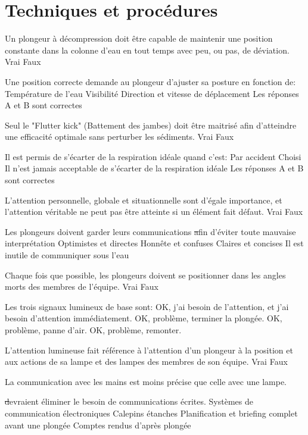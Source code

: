 \documentclass[english,10pt,a4paper,twoside]{article}
\begin{document}
	\section{Techniques et procédures}
	\begin{outline}
		\1 Un plongeur à décompression doit être capable de maintenir une position constante dans la colonne d'eau en tout temps avec peu, ou pas, de déviation.
			\2 Vrai
			\2 Faux

		\1 Une position correcte demande au plongeur d'ajuster sa posture en fonction de:
			\2 Température de l'eau
			\2 Visibilité
			\2 Direction et vitesse de déplacement
			\2 Les réponses A et B sont correctes

		\1 Seul le "Flutter kick" (Battement des jambes) doit être maitrisé afin d'atteindre une efficacité optimale sans perturber les sédiments.
			\2 Vrai
			\2 Faux

		\1 Il est permis de s'écarter de la respiration idéale quand c'est:
			\2 Par accident
			\2 Choisi
			\2 Il n'est jamais acceptable de s'écarter de la respiration idéale
			\2 Les réponses A et B sont correctes

		\1 L'attention personnelle, globale et situationnelle sont d'égale importance, et l'attention véritable ne peut pas être atteinte si un élément fait défaut.
			\2 Vrai
			\2 Faux

		\1 Les plongeurs doivent garder leurs communications \st afin d'éviter toute mauvaise interprétation
			\2 Optimistes et directes
			\2 Honnête et confuses
			\2 Claires et concises
			\2 Il est inutile de communiquer sous l'eau

		\1 Chaque fois que possible, les plongeurs doivent se positionner dans les angles morts des membres de l'équipe.
			\2 Vrai
			\2 Faux

		\1 Les trois signaux lumineux de base sont:
			\2 OK, j'ai besoin de l'attention, et j'ai besoin d'attention immédiatement.
			\2 OK, problème, terminer la plongée.
			\2 OK, problème, panne d'air.
			\2 OK, problème, remonter.

		\1 L'attention lumineuse fait référence à l'attention d'un plongeur à la position et aux actions de sa lampe et des lampes des membres de son équipe.
			\2 Vrai
			\2 Faux

		\1 La communication avec les mains est moins précise que celle avec une lampe. \vf

		\1 \st devraient éliminer le besoin de communications écrites.
			\2 Systèmes de communication électroniques
			\2 Calepins étanches
			\2 Planification et briefing complet avant une plongée
			\2 Comptes rendus d'après plongée


\end{outline}
\end{document}
